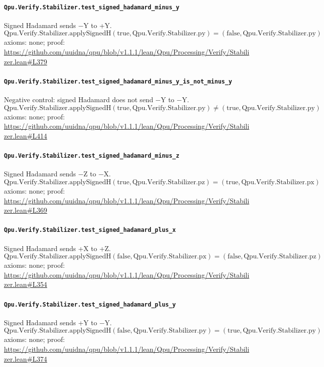 \documentclass[11pt]{article}
\begin{document}
\paragraph{\texttt{Qpu.Verify.Stabilizer.test\_signed\_hadamard\_minus\_y}}
Signed Hadamard sends −Y to +Y.
\[ \mathrm{Qpu.Verify.Stabilizer.applySignedH} (\mathrm{true}, \mathrm{Qpu.Verify.Stabilizer.py}) = (\mathrm{false}, \mathrm{Qpu.Verify.Stabilizer.py}) \]
\noindent axioms: none; proof: \url{https://github.com/uuidna/qpu/blob/v1.1.1/lean/Qpu/Processing/Verify/Stabilizer.lean\#L379}

\paragraph{\texttt{Qpu.Verify.Stabilizer.test\_signed\_hadamard\_minus\_y\_is\_not\_minus\_y}}
Negative control: signed Hadamard does not send −Y to −Y.
\[ \mathrm{Qpu.Verify.Stabilizer.applySignedH} (\mathrm{true}, \mathrm{Qpu.Verify.Stabilizer.py}) \ne (\mathrm{true}, \mathrm{Qpu.Verify.Stabilizer.py}) \]
\noindent axioms: none; proof: \url{https://github.com/uuidna/qpu/blob/v1.1.1/lean/Qpu/Processing/Verify/Stabilizer.lean\#L414}

\paragraph{\texttt{Qpu.Verify.Stabilizer.test\_signed\_hadamard\_minus\_z}}
Signed Hadamard sends −Z to −X.
\[ \mathrm{Qpu.Verify.Stabilizer.applySignedH} (\mathrm{true}, \mathrm{Qpu.Verify.Stabilizer.pz}) = (\mathrm{true}, \mathrm{Qpu.Verify.Stabilizer.px}) \]
\noindent axioms: none; proof: \url{https://github.com/uuidna/qpu/blob/v1.1.1/lean/Qpu/Processing/Verify/Stabilizer.lean\#L369}

\paragraph{\texttt{Qpu.Verify.Stabilizer.test\_signed\_hadamard\_plus\_x}}
Signed Hadamard sends +X to +Z.
\[ \mathrm{Qpu.Verify.Stabilizer.applySignedH} (\mathrm{false}, \mathrm{Qpu.Verify.Stabilizer.px}) = (\mathrm{false}, \mathrm{Qpu.Verify.Stabilizer.pz}) \]
\noindent axioms: none; proof: \url{https://github.com/uuidna/qpu/blob/v1.1.1/lean/Qpu/Processing/Verify/Stabilizer.lean\#L354}

\paragraph{\texttt{Qpu.Verify.Stabilizer.test\_signed\_hadamard\_plus\_y}}
Signed Hadamard sends +Y to −Y.
\[ \mathrm{Qpu.Verify.Stabilizer.applySignedH} (\mathrm{false}, \mathrm{Qpu.Verify.Stabilizer.py}) = (\mathrm{true}, \mathrm{Qpu.Verify.Stabilizer.py}) \]
\noindent axioms: none; proof: \url{https://github.com/uuidna/qpu/blob/v1.1.1/lean/Qpu/Processing/Verify/Stabilizer.lean\#L374}
\end{document}
